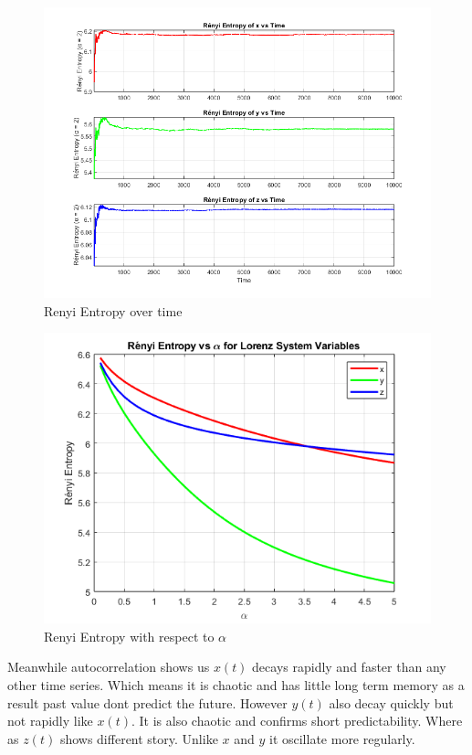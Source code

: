 \documentclass[%
reprint,
amsmath,amssymb,
aps,
floatfix,
]{revtex4-2}
\begin{document}
	\begin{figure}[htbp]
		\centering
		\includegraphics[width=0.8\linewidth]{RE_vs_time_x_y_z.png}
		\caption{Renyi Entropy over time}
		\label{fig:Renyi Entropy}
	\end{figure}
	\begin{figure}[htbp]
		\centering
		\includegraphics[width=0.8\linewidth]{renyi_entropy_vs_alpha_for_100_bin.png}
		\caption{Renyi Entropy with respect to $\alpha$}
		\label{fig:Renyi Entropy_alpha}
	\end{figure}
	\FloatBarrier
	Meanwhile autocorrelation shows us $x(t)$ decays rapidly and faster than any other time series.
	Which means it is chaotic and has little long term memory as a result past value dont predict the future.
	However $y(t)$ also decay quickly but not rapidly like $x(t)$. It is also chaotic and confirms short predictability. 
	Where as $z(t)$ shows different story. Unlike $x$ and $y$ it oscillate more regularly.
	\FloatBarrier
\end{document}
